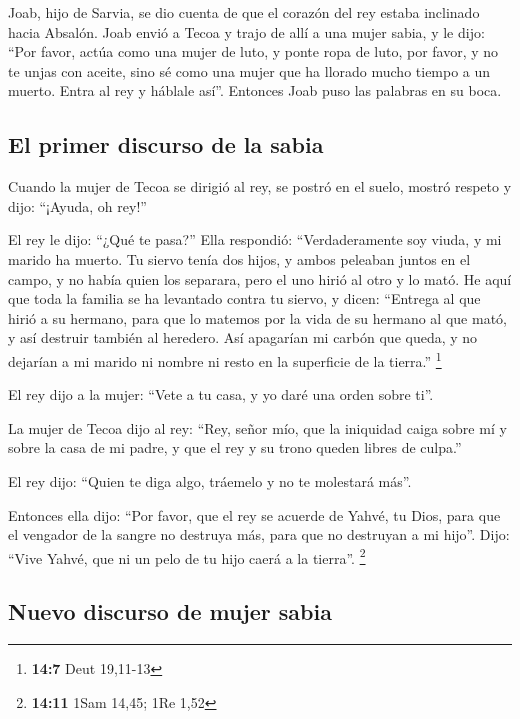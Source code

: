  Joab, hijo de Sarvia, se dio cuenta de que el corazón del
rey estaba inclinado hacia Absalón.  Joab envió a Tecoa y
trajo de allí a una mujer sabia, y le dijo: ``Por favor, actúa como una
mujer de luto, y ponte ropa de luto, por favor, y no te unjas con
aceite, sino sé como una mujer que ha llorado mucho tiempo a un muerto.
 Entra al rey y háblale así''. Entonces Joab puso las
palabras en su boca.

\hypertarget{el-primer-discurso-de-la-sabia}{%
\subsection{El primer discurso de la
sabia}\label{el-primer-discurso-de-la-sabia}}

 Cuando la mujer de Tecoa se dirigió al rey, se postró en
el suelo, mostró respeto y dijo: ``¡Ayuda, oh rey!''

 El rey le dijo: ``¿Qué te pasa?'' Ella respondió:
``Verdaderamente soy viuda, y mi marido ha muerto.  Tu
siervo tenía dos hijos, y ambos peleaban juntos en el campo, y no había
quien los separara, pero el uno hirió al otro y lo mató. 
He aquí que toda la familia se ha levantado contra tu siervo, y dicen:
``Entrega al que hirió a su hermano, para que lo matemos por la vida de
su hermano al que mató, y así destruir también al heredero. Así
apagarían mi carbón que queda, y no dejarían a mi marido ni nombre ni
resto en la superficie de la tierra.'' \footnote{\textbf{14:7} Deut
  19,11-13}

 El rey dijo a la mujer: ``Vete a tu casa, y yo daré una
orden sobre ti''.

 La mujer de Tecoa dijo al rey: ``Rey, señor mío, que la
iniquidad caiga sobre mí y sobre la casa de mi padre, y que el rey y su
trono queden libres de culpa.''

 El rey dijo: ``Quien te diga algo, tráemelo y no te
molestará más''.

 Entonces ella dijo: ``Por favor, que el rey se acuerde
de Yahvé, tu Dios, para que el vengador de la sangre no destruya más,
para que no destruyan a mi hijo''. Dijo: ``Vive Yahvé, que ni un pelo de
tu hijo caerá a la tierra''. \footnote{\textbf{14:11} 1Sam 14,45; 1Re
  1,52}

\hypertarget{nuevo-discurso-de-mujer-sabia}{%
\subsection{Nuevo discurso de mujer
sabia}\label{nuevo-discurso-de-mujer-sabia}}

